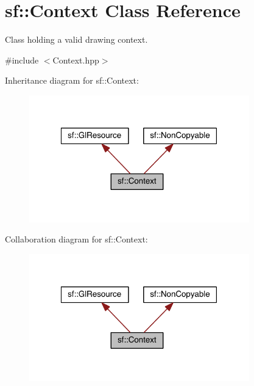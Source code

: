 \hypertarget{classsf_1_1_context}{\section{sf\-:\-:Context Class Reference}
\label{classsf_1_1_context}
}


Class holding a valid drawing context.  




{\ttfamily \#include $<$Context.\-hpp$>$}



Inheritance diagram for sf\-:\-:Context\-:
\nopagebreak
\begin{figure}[H]
\begin{center}
\leavevmode
\includegraphics[width=271pt]{classsf_1_1_context__inherit__graph}
\end{center}
\end{figure}


Collaboration diagram for sf\-:\-:Context\-:
\nopagebreak
\begin{figure}[H]
\begin{center}
\leavevmode
\includegraphics[width=271pt]{classsf_1_1_context__coll__graph}
\end{center}
\end{figure}
